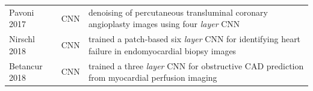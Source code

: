 \documentclass[journal]{IEEEtran}
\begin{document}
\begin{table}[!t]
\begin{minipage}{\textwidth}
\begin{tabularx}{\textwidth}{l c l}
			Pavoni 2017\cite{pavoni2017image}            & CNN             & denoising of percutaneous transluminal coronary angioplasty images using four \textit{layer} CNN                                                                                                                                 \\
			Nirschl 2018\cite{nirschl2018deep}           & CNN             & trained a patch-based six \textit{layer} CNN for identifying heart failure in endomyocardial biopsy images                                                                                                                       \\
			Betancur 2018\cite{betancur2018deep}         & CNN             & trained a three \textit{layer} CNN for obstructive CAD prediction from myocardial perfusion imaging                                                                                                                              \\
			\bottomrule
		\end{tabularx}
	\end{minipage}
\end{table}
\end{document}
